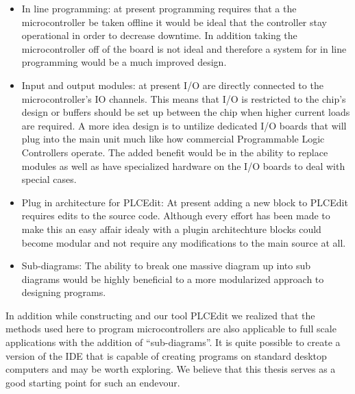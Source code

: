 \begin{itemize}
	\item In line programming: at present programming requires that a the microcontroller be taken offline it would be ideal that the controller stay operational in order to decrease downtime. In addition taking the microcontroller off of the board is not ideal and therefore a system for in line programming would be a much improved design.
	\item Input and output modules: at present I/O are directly connected to the microcontroller's IO channels. This means that I/O is restricted to the chip's design or buffers should be set up between the chip when higher current loads are required. A more idea design is to untilize dedicated I/O boards that will plug into the main unit much like how commercial Programmable Logic Controllers operate. The added benefit would be in the ability to replace modules as well as have specialized hardware on the I/O boards to deal with special cases.
	\item Plug in architecture for PLCEdit: At present adding a new block to PLCEdit requires edits to the source code. Although every effort has been made to make this an easy affair idealy with a plugin architechture blocks could become modular and not require any modifications to the main source at all.
	\item Sub-diagrams: The ability to break one massive diagram up into sub diagrams would be highly beneficial to a more modularized approach to designing programs.
\end{itemize}

In addition while constructing \plccharts and our tool PLCEdit we realized that the methods used here to program microcontrollers are also applicable to full scale applications with the addition of ``sub-diagrams''. It is quite possible to create a version of the IDE that is capable of creating programs on standard desktop computers and may be worth exploring. We believe that this thesis serves as a good starting point for such an endevour.